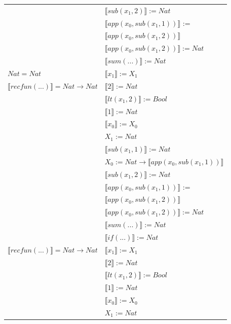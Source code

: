 \begin{exercise}
\begin{description}
\begin{center}
\begin{longtable}[!h]{ | l | l | }
			     & $ \llbracket sub(x_1,2) \rrbracket := Nat$ \\
			     & $ \llbracket app(x_0, sub(x_1,1)) \rrbracket$ := \\
			     & $ \llbracket app(x_0, sub(x_1,2)) \rrbracket$\\ 
			     & $ \llbracket app(x_0, sub(x_1,2)) \rrbracket := Nat$ \\
			     & $ \llbracket sum(...) \rrbracket := Nat$ \\
                     \hline 
                        $ Nat = Nat$ & $ \llbracket x_1 \rrbracket := X_1$\\
                        $ \llbracket recfun(...) \rrbracket =   Nat  \to  Nat $ & $ \llbracket 2 \rrbracket := Nat$\\ 
                        & $ \llbracket lt(x_1 , 2) \rrbracket := Bool$\\ 
                        & $ \llbracket 1 \rrbracket := Nat$\\  
			     & $ \llbracket x_0 \rrbracket := X_0$\\
			     & $X_1 := Nat$\\
			     & $ \llbracket sub(x_1,1) \rrbracket := Nat$\\
			     & $X_0 := Nat \to  \llbracket app(x_0, sub(x_1,1)) \rrbracket$ \\
			     & $ \llbracket sub(x_1,2) \rrbracket := Nat$ \\
			     & $ \llbracket app(x_0, sub(x_1,1)) \rrbracket$ := \\
			     & $ \llbracket app(x_0, sub(x_1,2)) \rrbracket$\\ 
			     & $ \llbracket app(x_0, sub(x_1,2)) \rrbracket := Nat$ \\
			     & $ \llbracket sum(...) \rrbracket := Nat$ \\
			     & $ \llbracket if(...) \rrbracket := Nat$  \\
                     \hline 
                        $ \llbracket recfun(...) \rrbracket =   Nat  \to Nat $ & $ \llbracket x_1 \rrbracket := X_1$\\
                        & $ \llbracket 2 \rrbracket := Nat$\\ 
                        & $ \llbracket lt(x_1 , 2) \rrbracket := Bool$\\  
			     & $ \llbracket 1 \rrbracket := Nat$\\
			     & $ \llbracket x_0 \rrbracket := X_0$\\
			     & $X_1 := Nat$\\

\end{longtable}
\end{center}
\end{description}
\end{exercise}
